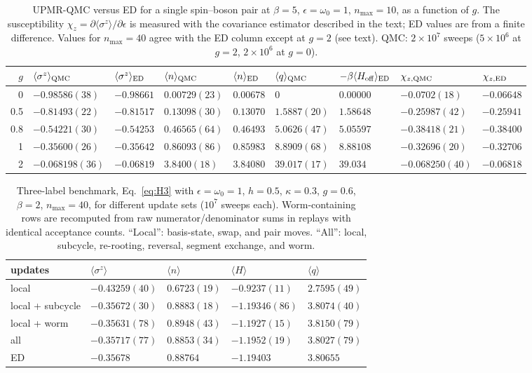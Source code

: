 \begin{table}[t]
\caption{UPMR-QMC versus ED for a single spin--boson pair at $\beta=5$, $\epsilon=\omega_0=1$, $n_{\max}=10$, as a function of $g$. The susceptibility $\chi_z=\partial\langle\sigma^z\rangle/\partial\epsilon$ is measured with the covariance estimator described in the text; ED values are from a finite difference. Values for $n_{\max}=40$ agree with the ED column except at $g=2$ (see text). QMC: $2\times10^7$ sweeps ($5\times10^6$ at $g=2$, $2\times10^6$ at $g=0$).}
\label{tab:sb_g}
\small
\begin{tabular}{r|ll|ll|ll|ll}
\hline\hline
$g$ & $\langle\sigma^z\rangle_{\rm QMC}$ & $\langle\sigma^z\rangle_{\rm ED}$ & $\langle n\rangle_{\rm QMC}$ & $\langle n\rangle_{\rm ED}$ & $\langle q\rangle_{\rm QMC}$ & $-\beta\langle H_{\rm off}\rangle_{\rm ED}$ & $\chi_{z,\rm QMC}$ & $\chi_{z,\rm ED}$\\
\hline
0 & $-0.98586(38)$ & $-0.98661$ & $0.00729(23)$ & $0.00678$ & $0$ & $0.00000$ & $-0.0702(18)$ & $-0.06648$ \\
0.5 & $-0.81493(22)$ & $-0.81517$ & $0.13098(30)$ & $0.13070$ & $1.5887(20)$ & $1.58648$ & $-0.25987(42)$ & $-0.25941$ \\
0.8 & $-0.54221(30)$ & $-0.54253$ & $0.46565(64)$ & $0.46493$ & $5.0626(47)$ & $5.05597$ & $-0.38418(21)$ & $-0.38400$ \\
1 & $-0.35600(26)$ & $-0.35642$ & $0.86093(86)$ & $0.85983$ & $8.8909(68)$ & $8.88108$ & $-0.32696(20)$ & $-0.32706$ \\
2 & $-0.068198(36)$ & $-0.06819$ & $3.8400(18)$ & $3.84080$ & $39.017(17)$ & $39.034$ & $-0.068250(40)$ & $-0.06818$ \\
\hline\hline
\end{tabular}
\end{table}

\begin{table}[t]
\caption{Three-label benchmark, Eq.~\eqref{eq:H3} with $\epsilon=\omega_0=1$, $h=0.5$, $\kappa=0.3$, $g=0.6$, $\beta=2$, $n_{\max}=40$, for different update sets ($10^7$ sweeps each). Worm-containing rows are recomputed from raw numerator/denominator sums in replays with identical acceptance counts. ``Local'': basis-state, swap, and pair moves. ``All'': local, subcycle, re-rooting, reversal, segment exchange, and worm.}
\label{tab:h3}
\begin{tabular}{lllll}
\hline\hline
updates & $\langle\sigma^z\rangle$ & $\langle n\rangle$ & $\langle H\rangle$ & $\langle q\rangle$\\
\hline
local & $-0.43259(40)$ & $0.6723(19)$ & $-0.9237(11)$ & $2.7595(49)$ \\
local + subcycle & $-0.35672(30)$ & $0.8883(18)$ & $-1.19346(86)$ & $3.8074(40)$ \\
local + worm & $-0.35631(78)$ & $0.8948(43)$ & $-1.1927(15)$ & $3.8150(79)$ \\
all & $-0.35717(77)$ & $0.8853(34)$ & $-1.1952(19)$ & $3.8027(79)$ \\
ED & $-0.35678$ & $0.88764$ & $-1.19403$ & $3.80655$ \\
\hline\hline
\end{tabular}
\end{table}

